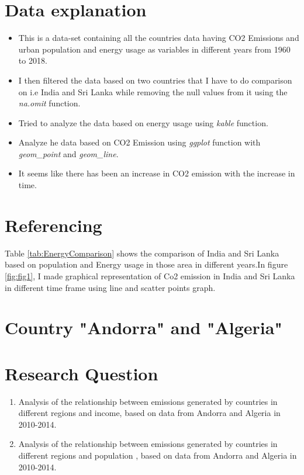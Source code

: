 \documentclass[11pt,a4paper,]{article}
\providecommand{\tightlist}{%
  \setlength{\itemsep}{0pt}\setlength{\parskip}{0pt}}
\begin{document}
\hypertarget{data-explanation}{%
\section{Data explanation}\label{data-explanation}}

\begin{itemize}
\tightlist
\item
  This is a data-set containing all the countries data having CO2 Emissions and urban population and energy usage as variables in different years from 1960 to 2018.
\item
  I then filtered the data based on two countries that I have to do comparison on i.e India and Sri Lanka while removing the null values from it using the \emph{na.omit} function.
\item
  Tried to analyze the data based on energy usage using \emph{kable} function.
\item
  Analyze he data based on CO2 Emission using \emph{ggplot} function with \emph{geom\_point} and \emph{geom\_line}.
\item
  It seems like there has been an increase in CO2 emission with the increase in time.
\end{itemize}

\hypertarget{referencing}{%
\section{Referencing}\label{referencing}}

Table \ref{tab:EnergyComparison} shows the comparison of India and Sri Lanka based on population and Energy usage in those area in different years.In figure \ref{fig:fig1}, I made graphical representation of Co2 emission in India and Sri Lanka in different time frame using line and scatter points graph.

\section*{Country "Andorra" and "Algeria"}

\hypertarget{research-question-1}{%
\section{Research Question}\label{research-question-1}}

\begin{enumerate}
\def\labelenumi{\arabic{enumi}.}
\item
  Analysis of the relationship between emissions generated by countries in different regions and income, based on data from Andorra and Algeria in 2010-2014.
\item
  Analysis of the relationship between emissions generated by countries in different regions and population , based on data from Andorra and Algeria in 2010-2014.
\end{enumerate}
\end{document}
